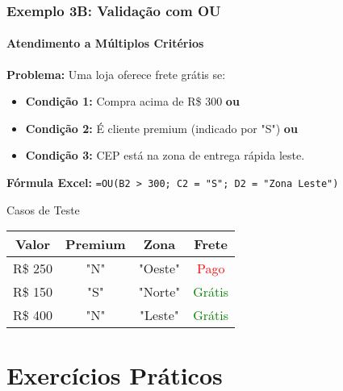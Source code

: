 \documentclass[12pt]{beamer}
\begin{document}
\begin{frame}
    \frametitle{Exemplo 3B: Validação com OU}
    \framesubtitle{Atendimento a Múltiplos Critérios}

    \textbf{Problema:} Uma loja oferece frete grátis se:
    \begin{itemize}
        \item \textbf{Condição 1:} Compra acima de R\$ 300 \textbf{ou}
        \item \textbf{Condição 2:} É cliente premium (indicado por "S") \textbf{ou}
        \item \textbf{Condição 3:} CEP está na zona de entrega rápida leste.
    \end{itemize}

    \textbf{Fórmula Excel:}
    \texttt{=OU(B2 > 300; C2 = "S"; D2 = "Zona Leste")}

    \begin{exampleblock}{Casos de Teste}
        \begin{tabular}{|c|c|c|c|}
            \hline
            \textbf{Valor} & \textbf{Premium} & \textbf{Zona} & \textbf{Frete} \\ \hline
            R\$ 250 & "N" & "Oeste" & \textcolor{red}{Pago} \\ \hline
            R\$ 150 & "S" & "Norte" & \textcolor{green}{Grátis} \\ \hline
            R\$ 400 & "N" & "Leste" & \textcolor{green}{Grátis} \\ \hline
        \end{tabular}
    \end{exampleblock}
\end{frame}

\section{Exercícios Práticos}
\end{document}
